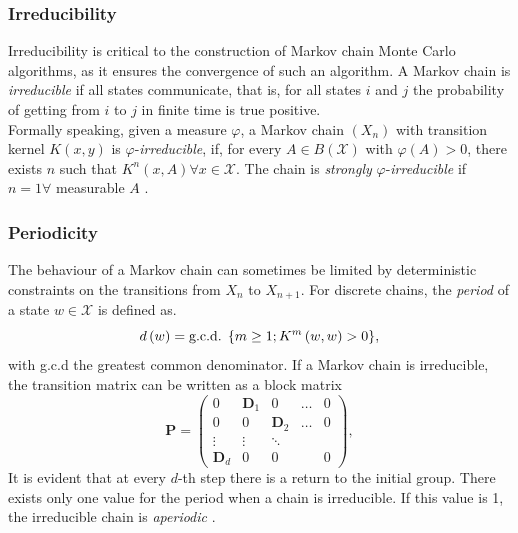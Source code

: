 \subsubsection{Irreducibility} 
Irreducibility is critical to the construction of Markov chain Monte Carlo algorithms, as it ensures the convergence of such an algorithm. A Markov chain is \textit{irreducible} if all states communicate, that is, for all states $i$ and $j$ the probability of getting from $i$ to $j$ in finite time is true positive. \\
Formally speaking, given a measure $\varphi$, a Markov chain $\left(X_n\right)$ with transition kernel $K\left(x,y\right)$ is $\varphi$-\textit{irreducible}, if, for every $A\in B\left(\mathcal{X}\right)$ with $\varphi\left(A\right)>0$, there exists $n$ such that $K^n\left(x,A\right) \forall x\in\mathcal{X}$. The chain is \textit{strongly} $\varphi$-\textit{irreducible} if $n=1\forall$ measurable $A$ \autocite[][213--214]{robert2013monte}.
\subsubsection{Periodicity} 
The behaviour of a Markov chain can sometimes be limited by deterministic constraints on the transitions from $X_n$ to $X_{n+1}$. For discrete chains, the \textit{period} of a state $w\in\mathcal{X}$ is defined as. 
\begin{equation*}
    d\left(w\right)=\hbox{g.c.d. } \lbrace m\geq 1;K^m\left(w,w\right)>0\rbrace,
\end{equation*}
with g.c.d the greatest common denominator. If a Markov chain is irreducible, the transition matrix can be written as a block matrix
\begin{equation}
    \pmb{P}=\begin{pmatrix}
    0 & \pmb{D}_1 & 0 & \dots & 0\\
    0 & 0 & \pmb{D}_2 & \dots & 0 \\
    \vdots & \vdots & \ddots  \\
    \pmb{D}_d & 0 & 0 & & 0
    \end{pmatrix},
\end{equation}
It is evident that at every $d$-th step there is a return to the initial group. There exists only one value for the period when a chain is irreducible. If this value is 1, the irreducible chain is \textit{aperiodic} \autocite[][217--218]{robert2013monte}.
